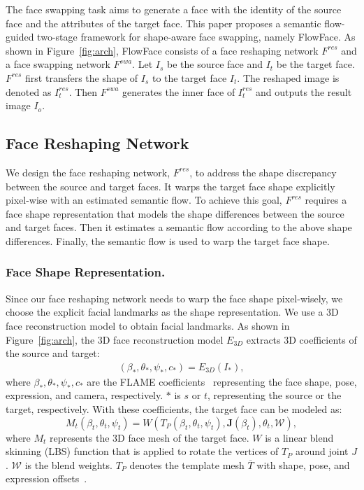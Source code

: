 The face swapping task aims to generate a face with the identity of the source face and the attributes of the target face. This paper proposes a semantic flow-guided two-stage framework for shape-aware face swapping, namely FlowFace. As shown in Figure~\ref{fig:arch}, FlowFace consists of a face reshaping network $F^{res}$ and a face swapping network $F^{swa}$. Let $I_{s}$ be the source face and $I_{t}$ be the target face. $F^{res}$ first transfers the shape of $I_s$ to the target face $I_t$. The reshaped image is denoted as $I^{res}_{t}$. Then $F^{swa}$ generates the inner face of $I^{res}_{t}$ and outputs the result image $I_{o}$.

\subsection{Face Reshaping Network}
We design the face reshaping network, $F^{res}$, to address the shape discrepancy between the source and target faces. It warps the target face shape explicitly pixel-wise with an estimated semantic flow. To achieve this goal, $F^{res}$ requires a face shape representation that models the shape differences between the source and target faces. Then it estimates a semantic flow according to the above shape differences. Finally, the semantic flow is used to warp the target face shape.

\subsubsection{Face Shape Representation.}\label{para:face_shape_representation} 
Since our face reshaping network needs to warp the face shape pixel-wisely, we choose the explicit facial landmarks as the shape representation. We use a 3D face reconstruction model to obtain facial landmarks. As shown in Figure~\ref{fig:arch}, the 3D face reconstruction model $E_{3D}$ extracts 3D coefficients of the source and target: 
\begin{equation}
\begin{split}
(\beta_*, \theta_*, \psi_*, c_*)=E_{3D}(I_*),
\end{split}
\end{equation}
where $\beta_*, \theta_*, \psi_*, c_*$ are the FLAME coefficients~\cite{FLAME:SiggraphAsia2017} representing the face shape, pose, expression, and camera, respectively. $*$ is $s$ or $t$, representing the source or the target, respectively. With these coefficients, the target face can be modeled as:
\begin{equation}
M_t(\beta_t, \theta_t, \psi_t)=W\left(T_P(\beta_t, \theta_t, \psi_t), \mathbf{J}(\beta_t), \theta_t, \mathcal{W}\right),
\end{equation}
where $M_t$ represents the 3D face mesh of the target face. $W$ is a linear blend skinning (LBS) function that is applied to rotate the vertices of $T_P$ around joint $J$. $\mathcal{W}$ is the blend weights. $T_P$ denotes the template mesh $\overline{T}$ with shape, pose, and expression offsets~\cite{FLAME:SiggraphAsia2017}.


